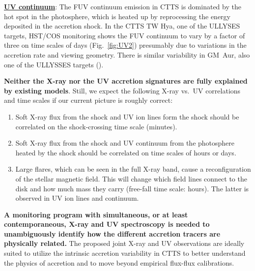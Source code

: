 \documentclass[letterpaper,11pt,twocolumn]{article}
\begin{document}
\underline{\bf UV continuum}: The FUV continuum emission in CTTS is
dominated by the hot spot in the photosphere, which is heated up by
reprocessing the energy deposited in the accretion shock. In the CTTS
TW Hya, one of the ULLYSES targets, HST/COS monitoring shows the FUV
continuum to vary by a factor of three on time scales of days
(Fig.~\ref{fig:UV2}) presumably due to variations in the
accretion rate and viewing geometry. There is similar variability in
GM~Aur, also one of the ULLYSSES targets ().


{\bf Neither the X-ray nor the UV accretion signatures are fully explained by existing models}. Still, we expect the following X-ray vs.\ UV correlations and time scales if our current picture is roughly correct:
\begin{enumerate}
    \itemsep1pt
    \item Soft X-ray flux from the shock and UV ion lines form the shock should be correlated on the shock-crossing time scale (minutes).
    \item Soft X-ray flux from the shock and UV continuum from the photosphere heated by the shock should be correlated on time scales of hours or days.
    \item Large flares, which can be seen in the full X-ray band, cause a reconfiguration of the stellar magnetic field. This will change which field lines connect to the disk and how much mass they carry (free-fall time scale: hours). The latter is observed in UV ion lines and continuum.
\end{enumerate}

\textbf{A monitoring program with simultaneous, or at least contemporaneous, X-ray and UV spectroscopy
is needed to unambiguously identify how the different 
accretion tracers are physically related.} The proposed joint X-ray and UV observations are ideally
suited to utilize the intrinsic accretion variability in
CTTS to better understand the physics of accretion and to move beyond 
empirical flux-flux calibrations. 
\end{document}
